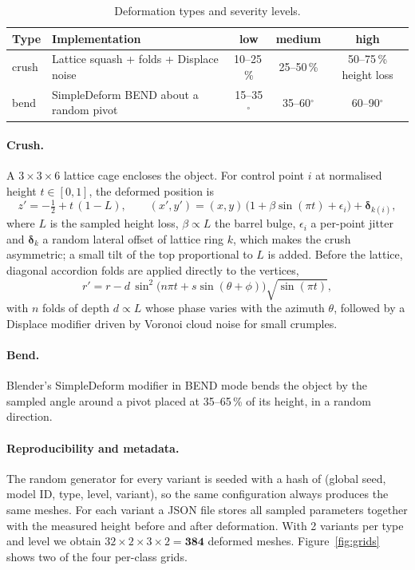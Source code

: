 \documentclass[11pt,a4paper]{article}
\begin{document}
\begin{table}[H]
\centering
\small
\begin{tabular}{l l c c c}
\toprule
Type & Implementation & low & medium & high \\
\midrule
crush & Lattice squash + folds + Displace noise & 10--25\,\% & 25--50\,\% & 50--75\,\% height loss \\
bend & SimpleDeform BEND about a random pivot & 15--35$^\circ$ & 35--60$^\circ$ & 60--90$^\circ$ \\
\bottomrule
\end{tabular}
\caption{Deformation types and severity levels.}
\label{tab:levels}
\end{table}

\paragraph{Crush.} A $3\times3\times6$ lattice cage encloses the object. For control point
$i$ at normalised height $t\in[0,1]$, the deformed position is
\begin{equation}
  z' = -\tfrac{1}{2} + t\,(1-L), \qquad
  (x', y') = (x, y)\,\bigl(1 + \beta \sin(\pi t) + \epsilon_i\bigr) + \boldsymbol{\delta}_{k(i)},
\end{equation}
where $L$ is the sampled height loss, $\beta \propto L$ the barrel bulge, $\epsilon_i$ a
per-point jitter and $\boldsymbol{\delta}_k$ a random lateral offset of lattice ring $k$, which
makes the crush asymmetric; a small tilt of the top proportional to $L$ is added. Before the
lattice, diagonal accordion folds are applied directly to the vertices,
\begin{equation}
  r' = r - d\,\sin^2\!\bigl(n\pi t + s\sin(\theta+\phi)\bigr)\sqrt{\sin(\pi t)},
\end{equation}
with $n$ folds of depth $d\propto L$ whose phase varies with the azimuth $\theta$, followed by a
Displace modifier driven by Voronoi cloud noise for small crumples.

\paragraph{Bend.} Blender's SimpleDeform modifier in BEND mode bends the object by the sampled
angle around a pivot placed at 35--65\,\% of its height, in a random direction.

\paragraph{Reproducibility and metadata.} The random generator for every variant is seeded with a
hash of (global seed, model ID, type, level, variant), so the same configuration always produces
the same meshes. For each variant a JSON file stores all sampled parameters together with the
measured height before and after deformation. With 2 variants per type and level we obtain
$32 \times 2 \times 3 \times 2 = \mathbf{384}$ deformed meshes. Figure~\ref{fig:grids} shows two
of the four per-class grids.
\end{document}
